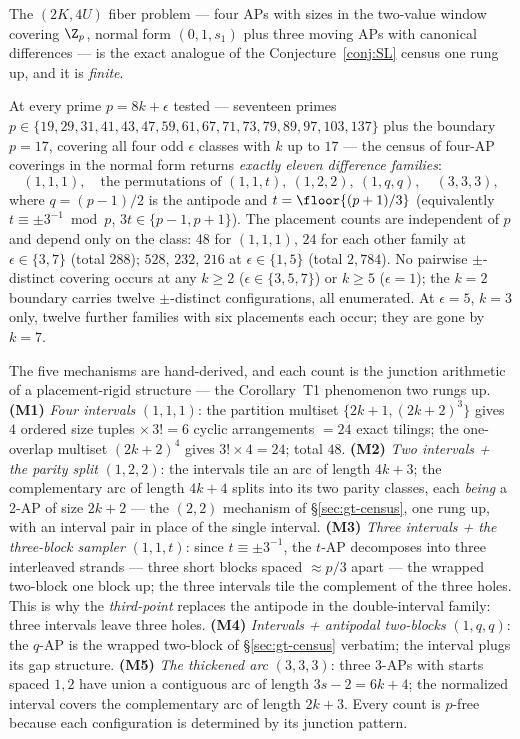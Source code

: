 The $(2K,4U)$ fiber problem --- four APs with sizes in the two-value
window covering $\Z_p$, normal form $(0,1,s_1)$ plus three moving APs
with canonical differences --- is the exact analogue of the
Conjecture~\ref{conj:SL} census one rung up, and it is \emph{finite}.

\begin{proposition}
\label{prop:T8census}
At every prime $p=8k+\epsilon$ tested --- seventeen primes
$p\in\{19,29,31,41,43,47,59,61,67,71,73,79,89,97,103,137\}$ plus the
boundary $p=17$, covering all four odd $\epsilon$ classes with $k$ up to
$17$ --- the census of four-AP coverings in the normal form returns
\emph{exactly eleven difference families}:
\[
(1,1,1),\quad\text{the permutations of }(1,1,t),\ (1,2,2),\ (1,q,q),
\quad(3,3,3),
\]
where $q=(p-1)/2$ is the antipode and $t=\floor{(p+1)/3}$ (equivalently
$t\equiv\pm3^{-1}\bmod p$, $3t\in\{p-1,p+1\}$). The placement counts are
independent of $p$ and depend only on the class:
$48$ for $(1,1,1)$, $24$ for each other family at $\epsilon\in\{3,7\}$
(total $288$); $528$, $232$, $216$ at $\epsilon\in\{1,5\}$ (total
$2{,}784$). No pairwise $\pm$-distinct covering occurs at any $k\ge2$
($\epsilon\in\{3,5,7\}$) or $k\ge5$ ($\epsilon=1$); the $k=2$ boundary
carries twelve $\pm$-distinct configurations, all enumerated. At
$\epsilon=5$, $k=3$ only, twelve further families with six placements
each occur; they are gone by $k=7$.
\end{proposition}

The five mechanisms are hand-derived, and each count is the junction
arithmetic of a placement-rigid structure --- the Corollary~T1
phenomenon two rungs up. \textbf{(M1)} \emph{Four intervals} $(1,1,1)$:
the partition multiset $\{2k+1,(2k+2)^3\}$ gives $4$ ordered size
tuples $\times\,3!=6$ cyclic arrangements $=24$ exact tilings; the
one-overlap multiset $(2k+2)^4$ gives $3!\times4=24$; total $48$.
\textbf{(M2)} \emph{Two intervals + the parity split} $(1,2,2)$: the
intervals tile an arc of length $4k+3$; the complementary arc of length
$4k+4$ splits into its two parity classes, each \emph{being} a 2-AP of
size $2k+2$ --- the $(2,2)$ mechanism of \S\ref{sec:gt-census}, one rung
up, with an interval pair in place of the single interval.
\textbf{(M3)} \emph{Three intervals + the three-block sampler}
$(1,1,t)$: since $t\equiv\pm3^{-1}$, the $t$-AP decomposes into three
interleaved strands --- three short blocks spaced $\approx p/3$ apart
--- the wrapped two-block one block up; the three intervals tile the
complement of the three holes. This is why the \emph{third-point}
replaces the antipode in the double-interval family: three intervals
leave three holes. \textbf{(M4)} \emph{Intervals + antipodal
two-blocks} $(1,q,q)$: the $q$-AP is the wrapped two-block of
\S\ref{sec:gt-census} verbatim; the interval plugs its gap structure.
\textbf{(M5)} \emph{The thickened arc} $(3,3,3)$: three 3-APs with
starts spaced $1,2$ have union a contiguous arc of length $3s-2=6k+4$;
the normalized interval covers the complementary arc of length $2k+3$.
Every count is $p$-free because each configuration is determined by its
junction pattern.

